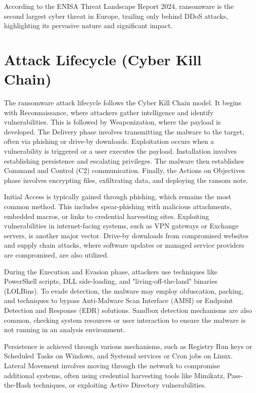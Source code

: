 \documentclass[12pt,a4paper]{article}
\begin{document}
According to the ENISA Threat Landscape Report 2024, ransomware is the second largest cyber threat in Europe, trailing only behind DDoS attacks, highlighting its pervasive nature and significant impact.

\section{Attack Lifecycle (Cyber Kill Chain)}
The ransomware attack lifecycle follows the Cyber Kill Chain model. It begins with Reconnaissance, where attackers gather intelligence and identify vulnerabilities. This is followed by Weaponization, where the payload is developed. The Delivery phase involves transmitting the malware to the target, often via phishing or drive-by downloads. Exploitation occurs when a vulnerability is triggered or a user executes the payload. Installation involves establishing persistence and escalating privileges. The malware then establishes Command and Control (C2) communication. Finally, the Actions on Objectives phase involves encrypting files, exfiltrating data, and deploying the ransom note.

Initial Access is typically gained through phishing, which remains the most common method. This includes spear-phishing with malicious attachments, embedded macros, or links to credential harvesting sites. Exploiting vulnerabilities in internet-facing systems, such as VPN gateways or Exchange servers, is another major vector. Drive-by downloads from compromised websites and supply chain attacks, where software updates or managed service providers are compromised, are also utilized.

During the Execution and Evasion phase, attackers use techniques like PowerShell scripts, DLL side-loading, and "living-off-the-land" binaries (LOLBins). To evade detection, the malware may employ obfuscation, packing, and techniques to bypass Anti-Malware Scan Interface (AMSI) or Endpoint Detection and Response (EDR) solutions. Sandbox detection mechanisms are also common, checking system resources or user interaction to ensure the malware is not running in an analysis environment.

Persistence is achieved through various mechanisms, such as Registry Run keys or Scheduled Tasks on Windows, and Systemd services or Cron jobs on Linux. Lateral Movement involves moving through the network to compromise additional systems, often using credential harvesting tools like Mimikatz, Pass-the-Hash techniques, or exploiting Active Directory vulnerabilities.
\end{document}
